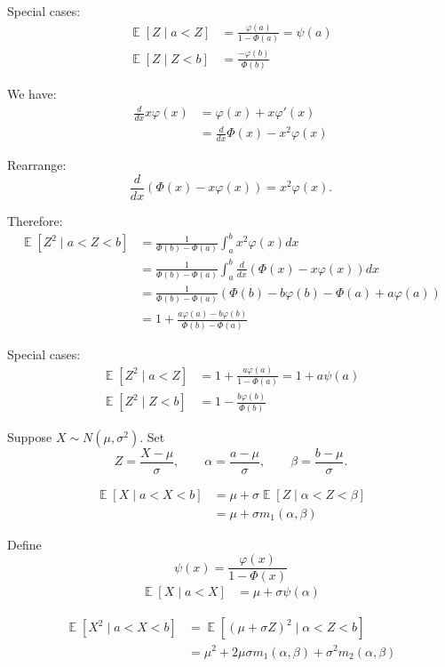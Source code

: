 \documentclass{amsart}
\renewcommand{\phi}{\varphi}
\DeclareMathOperator{\Exp}{\mathbb{E}}
\begin{document}
Special cases:
\begin{align*}
    \Exp[Z\mid a < Z] &= \frac{\phi(a)}{1 - \Phi(a)} = \psi(a)\\
    \Exp[Z\mid Z < b] &= \frac{-\phi(b)}{\Phi(b)}
\end{align*}

We have:
\begin{align*}
\frac{d}{dx}x\phi(x) &= \phi(x) + x\phi'(x)\\
&= \frac{d}{dx}\Phi(x) - x^2\phi(x)
\end{align*}

Rearrange:
\[
\frac{d}{dx}\left(\Phi(x) - x\phi(x)\right) = x^2\phi(x).
\]

Therefore:
\begin{align*}
    \Exp[Z^2\mid a < Z < b] &= \frac1{\Phi(b) - \Phi(a)}\int_a^b x^2\phi(x)dx\\
    &= \frac1{\Phi(b) - \Phi(a)}\int_a^b \frac{d}{dx}\left(\Phi(x) - x\phi(x)\right)dx\\
    &= \frac1{\Phi(b) - \Phi(a)}\left(\Phi(b) - b\phi(b) - \Phi(a) + a\phi(a)\right)\\
    &= 1 + \frac{a\phi(a) - b\phi(b)}{\Phi(b) - \Phi(a)}
\end{align*}

Special cases:
\begin{align*}
    \Exp[Z^2 \mid a < Z] &= 1 + \frac{a\phi(a)}{1 - \Phi(a)} = 1 + a\psi(a)\\
    \Exp[Z^2 \mid Z < b] &= 1 - \frac{b\phi(b)}{\Phi(b)}
\end{align*}

Suppose $X\sim N(\mu, \sigma^2)$.
Set
\[
Z = \frac{X - \mu}{\sigma},\qquad
\alpha = \frac{a - \mu}{\sigma},\qquad
\beta = \frac{b - \mu}{\sigma}.
\]

\begin{align*}
\Exp[X\mid a < X < b] 
&= \mu + \sigma \Exp[Z\mid \alpha < Z < \beta]\\
&= \mu + \sigma m_1(\alpha, \beta)
\end{align*}

Define
\[
\psi(x) = \frac{\phi(x)}{1 - \Phi(x)}
\]
\begin{align*}
    \Exp[X\mid a < X] &= \mu + \sigma \psi(\alpha)
\end{align*}

\begin{align*}
    \Exp[X^2 \mid a < X < b]
    &= \Exp[(\mu + \sigma Z)^2 \mid \alpha < Z < b]\\
    &= \mu^2 + 2\mu\sigma m_1(\alpha, \beta) + \sigma^2 m_2(\alpha, \beta)
\end{align*}
\end{document}
